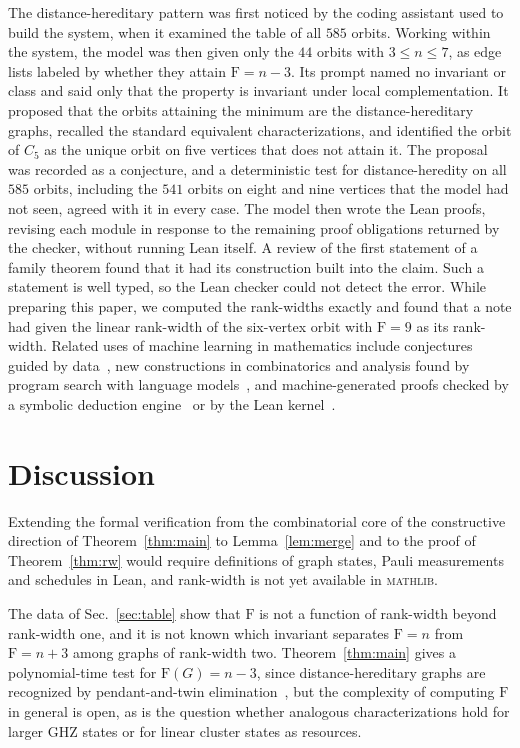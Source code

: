 \documentclass[aps,pra,onecolumn,superscriptaddress,nofootinbib,longbibliography]{revtex4-2}
\theoremstyle{plain}
\theoremstyle{remark}
\newcommand{\F}{\mathrm{F}}
\begin{document}
The distance-hereditary pattern was first noticed by the coding assistant used to build the system, when
it examined the table of all $585$ orbits. Working within the system, the model was then given only the
$44$ orbits with $3\le n\le 7$, as edge lists labeled by whether they attain $\F=n-3$. Its prompt named no
invariant or class and said only that the property is invariant under local complementation. It proposed that the orbits attaining the
minimum are the distance-hereditary graphs, recalled the standard equivalent characterizations, and
identified the orbit of $C_5$ as the unique orbit on five vertices that does not attain it. The proposal was
recorded as a conjecture, and a deterministic test for distance-heredity on all $585$ orbits, including the
$541$ orbits on eight and nine vertices that the model had not seen, agreed with it in every case. The
model then wrote the Lean proofs, revising each module in response to the remaining proof obligations
returned by the checker, without running Lean itself. A review of the first statement of a family theorem
found that it had its construction built into the claim. Such a statement is well typed, so the Lean
checker could not detect the error. While preparing this paper, we computed the rank-widths exactly and
found that a note had given the linear rank-width of the six-vertex orbit with $\F=9$ as its rank-width. Related uses of machine learning in mathematics include conjectures guided by
data~\cite{Davies2021advancing}, new constructions in combinatorics and analysis found by program search with
language models~\cite{RomeraParedes2024mathematical,Novikov2025alphaevolve,Georgiev2025mathematical}, and
machine-generated proofs checked by a symbolic deduction engine~\cite{Trinh2024solving} or by the Lean
kernel~\cite{Hubert2026olympiad}.

\section{Discussion}\label{sec:discussion}

Extending the formal verification from the combinatorial core of the constructive direction of
Theorem~\ref{thm:main} to Lemma~\ref{lem:merge} and to the proof of Theorem~\ref{thm:rw} would require
definitions of graph states, Pauli measurements and schedules in Lean, and rank-width is not yet
available in \textsc{mathlib}.

The data of Sec.~\ref{sec:table} show that $\F$ is not a function of rank-width beyond rank-width one, and
it is not known which invariant separates $\F=n$ from $\F=n+3$ among graphs of rank-width two.
Theorem~\ref{thm:main} gives a polynomial-time test for $\F(G)=n-3$, since distance-hereditary graphs are
recognized by pendant-and-twin elimination~\cite{Bandelt1986distance}, but the complexity of computing $\F$
in general is open, as is the question whether analogous characterizations hold for larger GHZ states or
for linear cluster states as resources.
\end{document}
